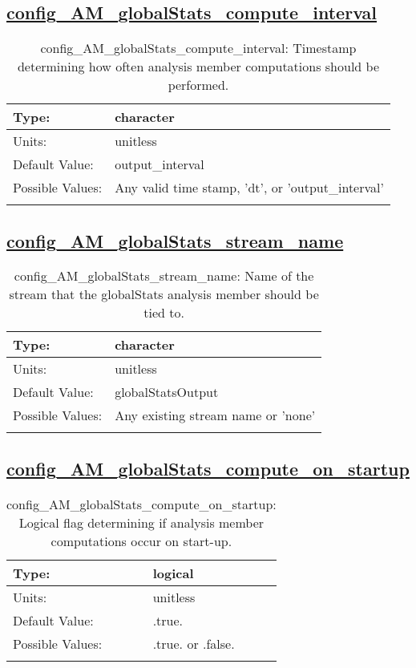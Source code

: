 \subsection[config\_AM\_globalStats\_compute\_interval]{\hyperref[sec:nm_tab_AM_globalStats]{config\_AM\_globalStats\_compute\_interval}}
\label{subsec:nm_sec_config_AM_globalStats_compute_interval}
\begin{center}
\begin{longtable}{| p{2.0in} || p{4.0in} |}
    \hline
    Type: & character \\
    \hline
    Units: & \si{unitless} \\
    \hline
    Default Value: & output\_interval \\
    \hline
    Possible Values: & Any valid time stamp, 'dt', or 'output\_interval' \\
    \hline
    \caption{config\_AM\_globalStats\_compute\_interval: Timestamp determining how often analysis member computations should be performed.}
\end{longtable}
\end{center}
\subsection[config\_AM\_globalStats\_stream\_name]{\hyperref[sec:nm_tab_AM_globalStats]{config\_AM\_globalStats\_stream\_name}}
\label{subsec:nm_sec_config_AM_globalStats_stream_name}
\begin{center}
\begin{longtable}{| p{2.0in} || p{4.0in} |}
    \hline
    Type: & character \\
    \hline
    Units: & \si{unitless} \\
    \hline
    Default Value: & globalStatsOutput \\
    \hline
    Possible Values: & Any existing stream name or 'none' \\
    \hline
    \caption{config\_AM\_globalStats\_stream\_name: Name of the stream that the globalStats analysis member should be tied to.}
\end{longtable}
\end{center}
\subsection[config\_AM\_globalStats\_compute\_on\_startup]{\hyperref[sec:nm_tab_AM_globalStats]{config\_AM\_globalStats\_compute\_on\_startup}}
\label{subsec:nm_sec_config_AM_globalStats_compute_on_startup}
\begin{center}
\begin{longtable}{| p{2.0in} || p{4.0in} |}
    \hline
    Type: & logical \\
    \hline
    Units: & \si{unitless} \\
    \hline
    Default Value: & .true. \\
    \hline
    Possible Values: & .true. or .false. \\
    \hline
    \caption{config\_AM\_globalStats\_compute\_on\_startup: Logical flag determining if analysis member computations occur on start-up.}
\end{longtable}
\end{center}
